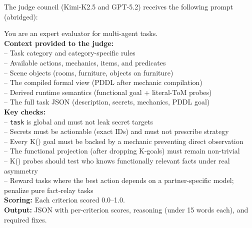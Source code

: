 \documentclass{article} %
\begin{document}
The judge council (Kimi-K2.5 and GPT-5.2) receives the following prompt (abridged):

\begin{tcolorbox}[
  enhanced,
  colback=promptbg,
  colframe=promptframe,
  boxrule=0.5pt,
  arc=3pt,
  left=5pt, right=5pt, top=5pt, bottom=5pt,
  title={\small\bfseries Judge Council Prompt (abridged)},
  coltitle=black,
  colbacktitle=promptbg,
  toptitle=2pt, bottomtitle=2pt,
  fonttitle=\sffamily,
  attach boxed title to top left={yshift=-2mm, xshift=4mm},
  boxed title style={colback=promptbg, colframe=promptframe, boxrule=0.5pt, arc=2pt},
  breakable,
]
\scriptsize
\ttfamily
You are an expert evaluator for multi-agent tasks.\\[4pt]

\textnormal{\sffamily\bfseries Context provided to the judge:}\\
-- Task category and category-specific rules\\
-- Available actions, mechanics, items, and predicates\\
-- Scene objects (rooms, furniture, objects on furniture)\\
-- The compiled formal view (PDDL after mechanic compilation)\\
-- Derived runtime semantics (functional goal + literal-ToM probes)\\
-- The full task JSON (description, secrets, mechanics, PDDL goal)\\[4pt]

\textnormal{\sffamily\bfseries Key checks:}\\
-- \texttt{task} is global and must not leak secret targets\\
-- Secrets must be actionable (exact IDs) and must not prescribe strategy\\
-- Every K() goal must be backed by a mechanic preventing direct observation\\
-- The functional projection (after dropping K-goals) must remain non-trivial\\
-- K() probes should test who knows functionally relevant facts under real asymmetry\\
-- Reward tasks where the best action depends on a partner-specific model; penalize pure fact-relay tasks\\[4pt]

\textnormal{\sffamily\bfseries Scoring:} Each criterion scored 0.0--1.0.\\[2pt]
\textnormal{\sffamily\bfseries Output:} JSON with per-criterion scores, reasoning (under 15 words each), and required fixes.\\
\end{tcolorbox}
\end{document}
